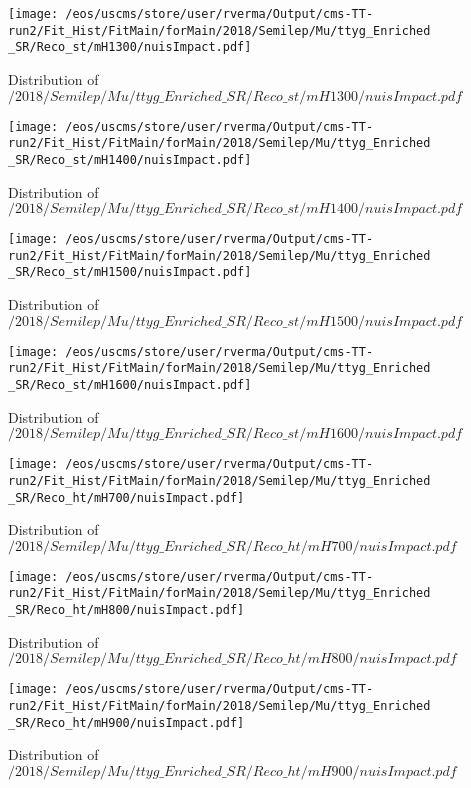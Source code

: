 \begin{figure}
\centering
\texttt{[image: /eos/uscms/store/user/rverma/Output/cms-TT-run2/Fit\_Hist/FitMain/forMain/2018/Semilep/Mu/ttyg\_Enriched\_SR/Reco\_st/mH1300/nuisImpact.pdf]}
\caption{Distribution of $/2018/Semilep/Mu/ttyg\_Enriched\_SR/Reco\_st/mH1300/nuisImpact.pdf$}
\end{figure}

\begin{figure}
\centering
\texttt{[image: /eos/uscms/store/user/rverma/Output/cms-TT-run2/Fit\_Hist/FitMain/forMain/2018/Semilep/Mu/ttyg\_Enriched\_SR/Reco\_st/mH1400/nuisImpact.pdf]}
\caption{Distribution of $/2018/Semilep/Mu/ttyg\_Enriched\_SR/Reco\_st/mH1400/nuisImpact.pdf$}
\end{figure}

\begin{figure}
\centering
\texttt{[image: /eos/uscms/store/user/rverma/Output/cms-TT-run2/Fit\_Hist/FitMain/forMain/2018/Semilep/Mu/ttyg\_Enriched\_SR/Reco\_st/mH1500/nuisImpact.pdf]}
\caption{Distribution of $/2018/Semilep/Mu/ttyg\_Enriched\_SR/Reco\_st/mH1500/nuisImpact.pdf$}
\end{figure}

\begin{figure}
\centering
\texttt{[image: /eos/uscms/store/user/rverma/Output/cms-TT-run2/Fit\_Hist/FitMain/forMain/2018/Semilep/Mu/ttyg\_Enriched\_SR/Reco\_st/mH1600/nuisImpact.pdf]}
\caption{Distribution of $/2018/Semilep/Mu/ttyg\_Enriched\_SR/Reco\_st/mH1600/nuisImpact.pdf$}
\end{figure}

\begin{figure}
\centering
\texttt{[image: /eos/uscms/store/user/rverma/Output/cms-TT-run2/Fit\_Hist/FitMain/forMain/2018/Semilep/Mu/ttyg\_Enriched\_SR/Reco\_ht/mH700/nuisImpact.pdf]}
\caption{Distribution of $/2018/Semilep/Mu/ttyg\_Enriched\_SR/Reco\_ht/mH700/nuisImpact.pdf$}
\end{figure}

\begin{figure}
\centering
\texttt{[image: /eos/uscms/store/user/rverma/Output/cms-TT-run2/Fit\_Hist/FitMain/forMain/2018/Semilep/Mu/ttyg\_Enriched\_SR/Reco\_ht/mH800/nuisImpact.pdf]}
\caption{Distribution of $/2018/Semilep/Mu/ttyg\_Enriched\_SR/Reco\_ht/mH800/nuisImpact.pdf$}
\end{figure}

\begin{figure}
\centering
\texttt{[image: /eos/uscms/store/user/rverma/Output/cms-TT-run2/Fit\_Hist/FitMain/forMain/2018/Semilep/Mu/ttyg\_Enriched\_SR/Reco\_ht/mH900/nuisImpact.pdf]}
\caption{Distribution of $/2018/Semilep/Mu/ttyg\_Enriched\_SR/Reco\_ht/mH900/nuisImpact.pdf$}
\end{figure}

